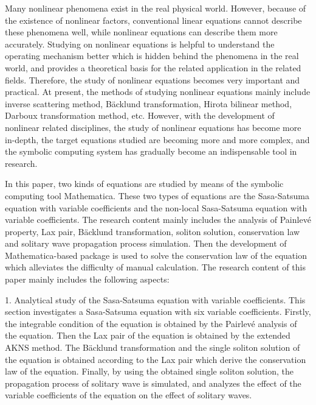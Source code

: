 \begin{eabstract}
Many nonlinear phenomena exist in the real physical world. However, because of the existence of nonlinear factors, conventional linear equations cannot describe these phenomena well, while nonlinear equations can describe them more accurately. Studying on nonlinear equations is helpful to understand the operating mechanism better which is hidden behind the phenomena in the real world, and provides a theoretical basis for the related application in the related fields. Therefore, the study of nonlinear equations becomes very important and practical.  At present, the methods of studying nonlinear equations mainly include inverse scattering method, B\"{a}cklund transformation, Hirota bilinear method, Darboux transformation method, etc.  However, with the development of nonlinear related disciplines, the study of nonlinear equations has become more
in-depth, the target equations studied are becoming more and more complex, and the symbolic computing system has gradually become an indispensable tool in research.

In this paper, two kinds of equations are studied by means of the symbolic computing tool Mathematica. These two types of equations are the Sasa-Satsuma equation with variable coefficients and the non-local Sasa-Satsuma equation with variable coefficients. The research content mainly includes the analysis of Painlev\'{e} property, Lax pair, B\"{a}cklund transformation, soliton solution, conservation law and solitary wave propagation process simulation. Then the development of Mathematica-based package is used to solve the conservation law of the equation which alleviates the difficulty of manual calculation. The research content of this paper mainly includes the following aspects:

1. Analytical study of the Sasa-Satsuma equation with variable coefficients.
This section investigates a Sasa-Satsuma equation with six variable coefficients. Firstly, the integrable condition of the equation is obtained by the Pairlev\'{e} analysis of the equation. Then the Lax pair of the equation is obtained by the extended AKNS method. The B\"{a}cklund transformation and the single soliton solution of the equation is obtained according to the Lax pair which derive the conservation law of the equation. Finally, by using the obtained single soliton solution, the propagation process of solitary wave is simulated, and analyzes the effect of the variable coefficients of the equation on the effect of solitary waves.


\end{eabstract}
